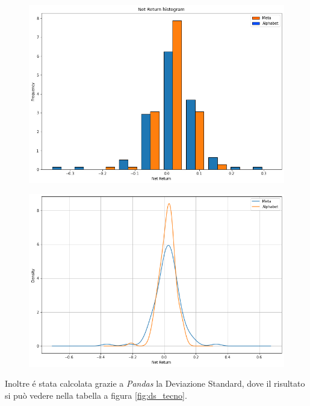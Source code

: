 \documentclass{article}
\begin{document}
\begin{figure}[h]
  \centering
  \begin{minipage}{.5\textwidth}
    \centering
    \includegraphics[width=1\linewidth]{net_ret_tecno_hist.png}
    \label{fig:isto_rendimenti_tecno}
  \end{minipage}%
  \begin{minipage}{.5\textwidth}
    \centering
    \includegraphics[width=1\linewidth]{dispersione_tecno.png}
    \label{fig:dispersione_tecno}
  \end{minipage}
\end{figure}

Inoltre é stata calcolata grazie a \emph{Pandas} la Deviazione Standard, dove il risultato si può vedere nella tabella a figura \ref{fig:ds_tecno}.
\end{document}
